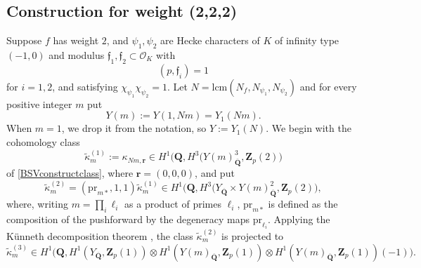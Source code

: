 \documentclass[10pt,letterpaper]{amsart}
\theoremstyle{plain}
\theoremstyle{definition}
\theoremstyle{definition}
\theoremstyle{plain}
\theoremstyle{plain}
\theoremstyle{plain}
\theoremstyle{remark}
\numberwithin{equation}{section}
\newcommand{\fkf}{\mathfrak{f}}
\DeclareMathOperator{\et}{\acute{e}t}
\def\cO{\mathcal O}
\newcommand{\Q}{\mathbf{Q}}
\newcommand{\Z}{\mathbf{Z}}
\begin{document}
\subsection{Construction for weight (2,2,2)}
\label{subsec:tame}

Suppose $f$ has weight $2$, and $\psi_1,\psi_2$ are Hecke characters of $K$ of infinity type $(-1,0)$ and modulus $\fkf_1,\fkf_2\subset\cO_K$ with 
\[
(p,\fkf_i)=1
\]
for $i=1,2$, and satisfying $\chi_{\psi_1}\chi_{\psi_2}=1$. Let $N=\text{lcm}(N_f,N_{\psi_1},N_{\psi_2})$ and for every positive integer $m$ put 
\begin{equation*}
    {Y(m):=Y(1,Nm)=Y_1(Nm)}.
\end{equation*} 
When $m=1$, we drop it from the notation, so $Y:=Y_1(N)$. We begin with the cohomology class
\begin{equation}\label{kappaBSV}
\tilde{\kappa}_m^{(1)}:=\kappa_{Nm,\mathbf{r}}\in H^1\bigl(\Q,H^3_{\et}(Y(m)^3_{\overline{\Q}},\Z_p(2)\bigr)
\end{equation}
of \eqref{BSVconstructclass}, where $\mathbf{r}=(0,0,0)$, and put  
\begin{equation}
    \tilde{\kappa}_m^{(2)}=({\mathrm{pr}}_{m*},1,1)\tilde{\kappa}_{m}^{(1)}\in H^1\bigl(\Q,H^3_{\et}(Y_{\overline{\Q}}\times Y(m)^2_{\overline{\Q}},\Z_p(2)\bigr),\nonumber
\end{equation}
where, writing $m=\prod_i\ell_i$ as a product of primes $\ell_i$, $\text{pr}_{m*}$ is defined as the composition of the pushforward by the degeneracy maps $\text{pr}_{\ell_i}$. Applying the K\"unneth decomposition theorem \cite[Thm.~22.4]{milne-lecture}, 
the class $\tilde{\kappa}_{m}^{(2)}$ is projected to
\begin{equation}\label{kappa3}
\tilde{\kappa}_{m}^{(3)}\in H^1\bigl(\Q,H^1_{\et}(Y_{\overline{\Q}},\Z_p(1))\otimes H^1_{\et}(Y(m)_{\overline{\Q}},\Z_p(1))\otimes H^1_{\et}(Y(m)_{\overline{\Q}},\Z_p(1))(-1)\bigr).
\end{equation}
\end{document}
